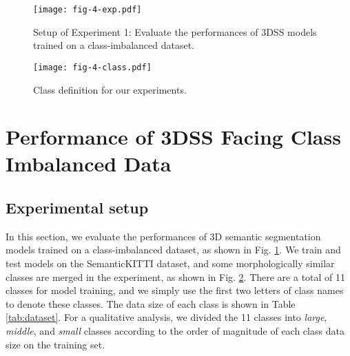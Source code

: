 \documentclass[journal]{IEEEtran}
\begin{document}
\begin{figure}[t]
	\centering
	\texttt{[image: fig-4-exp.pdf]}
	\vspace{-4mm}
	\caption{Setup of Experiment 1: Evaluate the performances of 3DSS models trained on a class-imbalanced dataset.}
	\label{fig:exp1}
	\vspace{-4mm}
\end{figure}

\begin{figure}[t]
	\centering
	\texttt{[image: fig-4-class.pdf]}
	\vspace{-3mm}
	\caption{Class definition for our experiments.}
	\label{fig:4-class}
	\vspace{-4mm}
\end{figure}

\section{Performance of 3DSS Facing Class Imbalanced Data} \label{sec:4}


\subsection{Experimental setup}
In this section, we evaluate the performances of 3D semantic segmentation models trained on a class-imbalanced dataset, as shown in Fig. \ref{fig:exp1}. 
We train and test models on the SemanticKITTI dataset, and some morphologically similar classes are merged in the experiment, as shown in Fig. \ref{fig:4-class}. There are a total of 11 classes for model training, and we simply use the first two letters of class names to denote these classes. The data size of each class is shown in Table \ref{tab:dataset}. For a qualitative analysis, we divided the 11 classes into \textit{large}, \textit{middle}, and \textit{small} classes according to the order of magnitude of each class data size on the training set. %
\end{document}
